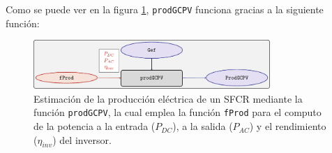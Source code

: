 Como se puede ver en la figura \ref{fig:prodgcpv}, \texttt{prodGCPV} funciona gracias a la siguiente función:
\begin{figure}[htbp]
\centering
\includegraphics[keepaspectratio,width=0.8\textwidth,height=\textheight]{figuras/prodgcpv.pdf}
\caption{Estimación de la producción eléctrica de un SFCR mediante la función \texttt{prodGCPV}, la cual emplea la función \texttt{fProd} para el computo de la potencia a la entrada (\(P_{DC}\)), a la salida (\(P_{AC}\)) y el rendimiento (\(\eta_{inv}\)) del inversor. \label{fig:prodgcpv}}
\end{figure}
